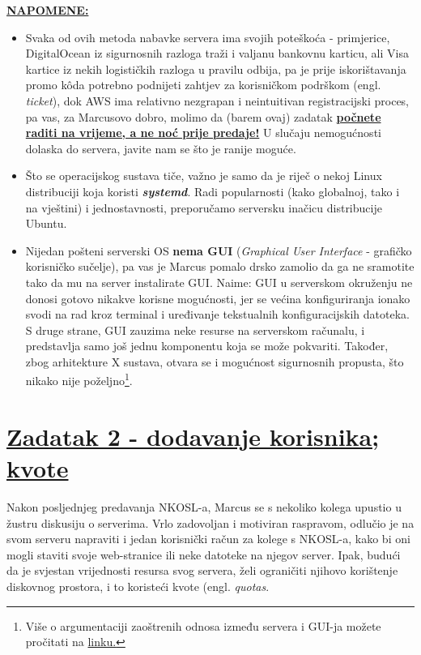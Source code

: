 \documentclass[12pt,a4paper]{article}
\begin{document}
  	\textbf{\underline{NAPOMENE:}}
  	\begin{itemize}
  		\item Svaka od ovih metoda nabavke servera ima svojih poteškoća - primjerice, DigitalOcean iz sigurnosnih razloga traži i valjanu bankovnu karticu, ali Visa kartice iz nekih logističkih razloga u pravilu odbija, pa je prije iskorištavanja promo kôda potrebno podnijeti zahtjev za korisničkom podrškom (engl. \textit{ticket}), dok AWS ima relativno nezgrapan i neintuitivan registracijski proces, pa vas, za Marcusovo dobro, molimo da (barem ovaj) zadatak \textbf{\underline{počnete raditi na vrijeme, a ne noć prije predaje!}} U slučaju nemogućnosti dolaska do servera, javite nam se što je ranije moguće.
  		\item Što se operacijskog sustava tiče, važno je samo da je riječ o nekoj Linux distribuciji koja koristi \textbf{\textit{systemd}}. Radi popularnosti (kako globalnoj, tako i na vještini) i jednostavnosti, preporučamo serversku inačicu distribucije Ubuntu. 
  		\item Nijedan pošteni serverski OS \textbf{nema GUI} (\textit{Graphical User Interface} - grafičko korisničko sučelje), pa vas je Marcus pomalo drsko zamolio da ga ne sramotite tako da mu na server instalirate GUI. Naime: GUI u serverskom okruženju ne donosi gotovo nikakve korisne mogućnosti, jer se većina konfiguriranja ionako svodi na rad kroz terminal i uređivanje tekstualnih konfiguracijskih datoteka. S druge strane, GUI zauzima neke resurse na serverskom računalu, i predstavlja samo još jednu komponentu koja se može pokvariti. Također, zbog arhitekture X sustava, otvara se i mogućnost sigurnosnih propusta, što nikako nije poželjno\footnote{Više o argumentaciji zaoštrenih odnosa između servera i GUI-ja možete pročitati na \href{https://help.ubuntu.com/community/ServerGUI}{linku.}}.
  	\end{itemize}

  	\newpage

	\section*{\underline{Zadatak 2 - dodavanje korisnika; kvote}}
		Nakon posljednjeg predavanja NKOSL-a, Marcus se s nekoliko kolega upustio u žustru diskusiju o serverima. Vrlo zadovoljan i motiviran raspravom, odlučio je na svom serveru napraviti i jedan korisnički račun za kolege s NKOSL-a, kako bi oni mogli staviti svoje web-stranice ili neke datoteke na njegov server. Ipak, budući da je svjestan vrijednosti resursa svog servera, želi ograničiti njihovo korištenje diskovnog prostora, i to koristeći kvote (engl. \textit{quotas}.
\end{document}
